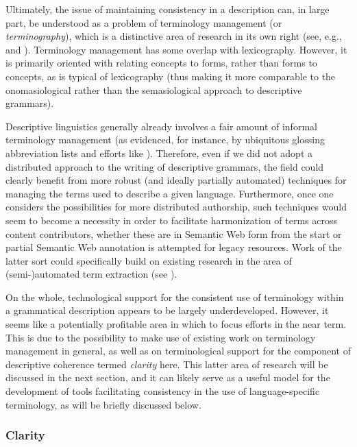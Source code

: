 Ultimately, the issue of maintaining consistency in a description can, in large
part, be understood as a problem of terminology management (or
\emph{terminography}), which is a distinctive area of research in its own right
(see, e.g.,  and
). Terminology management has some overlap with
lexicography. However, it is primarily oriented with relating concepts to forms,
rather than forms to concepts, as is typical of lexicography
\citep[7--8]{Cabre:1999} (thus making it more comparable to the onomasiological
rather than the semasiological approach to descriptive grammars).

Descriptive linguistics generally already involves a fair amount of informal
terminology management (as evidenced, for instance, by ubiquitous glossing
abbreviation lists and efforts like ). Therefore, even if we
did not adopt a distributed approach to the writing of descriptive grammars, the
field could clearly benefit from more robust (and ideally partially automated)
techniques for managing the terms used to describe a given language.
Furthermore, once one considers the possibilities for more distributed
authorship, such techniques would seem to become a necessity in order to
facilitate harmonization of terms across content contributors, whether these are
in Semantic Web form from the start or partial Semantic Web annotation is
attempted for legacy resources. Work of the latter sort could specifically build
on existing research in the area of (semi-)automated term extraction (see
).

On the whole, technological support for the consistent use of terminology within
a grammatical description appears to be largely underdeveloped. However, it
seems like a potentially profitable area in which to focus efforts in the near
term. This is due to the possibility to make use of existing work on terminology
management in general, as well as on terminological support for the component of
descriptive coherence termed \emph{clarity} here. This latter
area of research will be discussed in the next section, and it can likely serve
as a useful model for the development of tools facilitating consistency in the
use of language-specific terminology, as will be briefly discussed below.



\subsubsection{Clarity\label{Clarity}}

